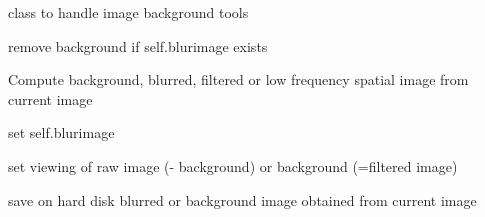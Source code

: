\documentclass[letterpaper,10pt,english]{sphinxmanual}
\begin{document}
\begin{fulllineitems}
\label{\detokenize{PeakSearchGUI:LaueTools.GUI.PeakSearchGUI.FilterBackGroundPanel}}
class to handle image background tools

\begin{fulllineitems}
\label{\detokenize{PeakSearchGUI:LaueTools.GUI.PeakSearchGUI.FilterBackGroundPanel.Computefilteredimage}}
remove background if self.blurimage exists

\end{fulllineitems}


\begin{fulllineitems}
\label{\detokenize{PeakSearchGUI:LaueTools.GUI.PeakSearchGUI.FilterBackGroundPanel.onComputeBlurImage}}
Compute background, blurred, filtered or low frequency spatial image
from current image

set self.blurimage

\end{fulllineitems}


\begin{fulllineitems}
\label{\detokenize{PeakSearchGUI:LaueTools.GUI.PeakSearchGUI.FilterBackGroundPanel.OnSwitchBlurRawImage}}
set viewing of raw image (- background) or background (=filtered image)

\end{fulllineitems}


\begin{fulllineitems}
\label{\detokenize{PeakSearchGUI:LaueTools.GUI.PeakSearchGUI.FilterBackGroundPanel.onSaveBlurImage}}
save on hard disk blurred or background image obtained from current image


\end{fulllineitems}
\end{fulllineitems}
\end{document}
